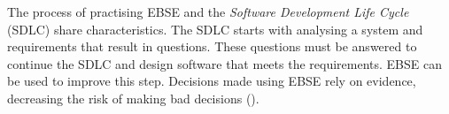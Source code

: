 \newline




The process of practising EBSE and the \emph{Software Development Life Cycle} (SDLC) share characteristics. The SDLC starts with analysing a system and requirements that result in questions. These questions must be answered to continue the SDLC and design software that meets the requirements. EBSE can be used to improve this step. Decisions made using EBSE rely on evidence, decreasing the risk of making bad decisions ().


